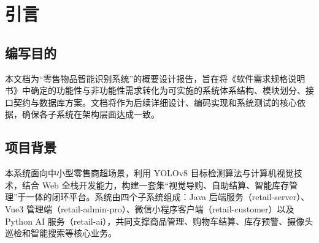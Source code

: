 
\setcounter{section}{0}
\renewcommand{\thesection}{\arabic{section}}
\renewcommand{\thesubsection}{\thesection.\arabic{subsection}}
\renewcommand{\thesubsubsection}{\thesubsection.\arabic{subsubsection}}

\section{引言}

\subsection{编写目的}
本文档为“零售物品智能识别系统”的概要设计报告，旨在将《软件需求规格说明书》中确定的功能性与非功能性需求转化为可实施的系统体系结构、模块划分、接口契约与数据库方案。文档将作为后续详细设计、编码实现和系统测试的核心依据，确保各子系统在架构层面达成一致。

\subsection{项目背景}
本系统面向中小型零售商超场景，利用 YOLOv8 目标检测算法与计算机视觉技术，结合 Web 全栈开发能力，构建一套集“视觉导购、自助结算、智能库存管理”于一体的闭环平台。系统由四个子系统组成：Java 后端服务（retail-server）、Vue3 管理端（retail-admin-pro）、微信小程序客户端（retail-customer）以及 Python AI 服务（retail-ai），共同支撑商品管理、购物车结算、库存预警、摄像头巡检和智能搜索等核心业务。


